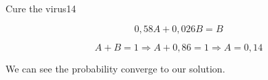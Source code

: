 \begin{questions}
\begin{question}{Cure the virus}{14}
\begin{answer}
\begin{enumerate}
				\begin{equation}
				0,58A + 0,026B = B
		\end{equation}
		
				\begin{equation}
				A + B = 1 \Rightarrow A + 0,86 = 1 \Rightarrow A = 0,14
		\end{equation}
		
		We can see the probability converge to our solution.

		
		\end{enumerate}
		
	\end{answer}
		
	\end{question}

	
\end{questions}

